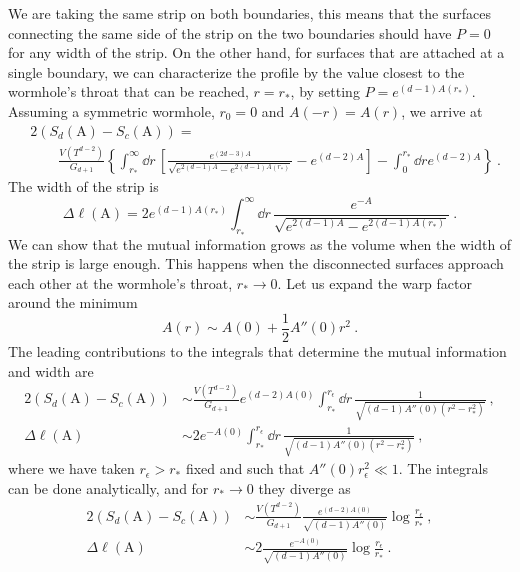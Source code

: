 We are taking the same strip on both boundaries, this means that the surfaces connecting the same side of the strip on the two boundaries should have $P=0$ for any width of the strip. On the other hand, for surfaces that are attached at a single boundary, we can characterize the profile by the value closest to the wormhole's throat that can be reached, $r=r_*$, by setting $P=e^{(d-1)A(r_*)}$. Assuming a symmetric wormhole, $r_0=0$ and $A(-r)=A(r)$, we arrive at
\begin{align}\label{eq:mutualinfstrip}
	&2 \left(S_d(\text{A})-S_c(\text{A})\right)
	=\\ &\qquad \nonumber
	\frac{V(T^{d-2})}{G_{d+1}}\left\{\int_{r_*}^\infty \dd r\, \left[\frac{e^{(2d-3)A}}{\sqrt{e^{2(d-1)A}-e^{2(d-1)A(r_*)}}}-e^{(d-2)A}\right]-\int_0^{r_*}\dd r e^{(d-2)A} \right\}\ .
\end{align}
The width of the strip is
\begin{equation}\label{eq:widthstrip}
	\Delta \ell(\text{A})=2e^{(d-1)A(r_*)}\int_{r_*}^\infty \dd r\, \frac{e^{-A}}{\sqrt{e^{2(d-1)A}-e^{2(d-1)A(r_*)}}}\ .
\end{equation}
We can show that the mutual information grows as the volume when the width of the strip is large enough. This happens when the disconnected surfaces approach each other at the wormhole's throat, $r_*\to 0$. Let us expand the warp factor around the minimum
\begin{equation}
	A(r)\sim A(0)+\frac{1}{2}A''(0) r^2\ .
\end{equation}
The leading contributions to the integrals that determine the mutual information and width are
\begin{equation}
\begin{split}
	2 (S_d(\text{A})-S_c(\text{A})) &\sim \frac{V(T^{d-2})}{G_{d+1}}e^{(d-2)A(0)}\int_{r_*}^{r_\epsilon} \dd r\, \frac{1}{\sqrt{(d-1)A''(0)(r^2-r_*^2)}}
	\ ,\\
	\Delta\ell(\text{A}) &\sim 2e^{-A(0)}\int_{r_*}^{r_\epsilon} \dd r\, \frac{1}{\sqrt{(d-1)A''(0)(r^2-r_*^2)}}\ ,
\end{split}
\end{equation}
where we have taken $r_\epsilon>r_*$ fixed and such that $A''(0)r_\epsilon^2\ll 1$. The integrals can be done analytically, and for $r_*\to 0$ they diverge as
\begin{equation}
\begin{split}
	2 (S_d(\text{A})-S_c(\text{A})) &\sim \frac{V(T^{d-2})}{G_{d+1}}\frac{e^{(d-2)A(0)}}{\sqrt{(d-1)A''(0)}}\log\frac{r_\epsilon}{r_*}
	\ ,\\
	\Delta\ell(\text{A}) &\sim 2\frac{e^{-A(0)}}{\sqrt{(d-1)A''(0)}}\log\frac{r_\epsilon}{r_*}\ .
\end{split}
\end{equation}

